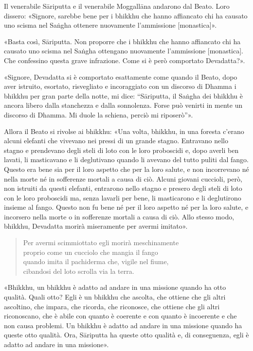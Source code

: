 Il venerabile Sāriputta e il venerabile Moggallāna andarono dal Beato. Loro
dissero: «Signore, sarebbe bene per i bhikkhu che hanno affiancato chi ha
causato uno scisma nel Saṅgha ottenere nuovamente l’ammissione [monastica]».

«Basta così, Sāriputta. Non proporre che i bhikkhu che hanno affiancato chi ha
causato uno scisma nel Saṅgha ottengano nuovamente l’ammissione [monastica]. Che
confessino questa grave infrazione. Come si è però comportato Devadatta?».

«Signore, Devadatta si è comportato esattamente come quando il Beato, dopo aver
istruito, esortato, risvegliato e incoraggiato con un discorso di Dhamma i
bhikkhu per gran parte della notte, mi dice: “Sāriputta, il Saṅgha dei bhikkhu è
ancora libero dalla stanchezza e dalla sonnolenza. Forse può venirti in mente un
discorso di Dhamma. Mi duole la schiena, perciò mi riposerò”».

Allora il Beato si rivolse ai bhikkhu: «Una volta, bhikkhu, in una foresta
c’erano alcuni elefanti che vivevano nei pressi di un grande stagno. Entravano
nello stagno e prendevano degli steli di loto con le loro proboscidi e, dopo
averli ben lavati, li masticavano e li deglutivano quando li avevano del tutto
puliti dal fango. Questo era bene sia per il loro aspetto che per la loro
salute, e non incorrevano né nella morte né in sofferenze mortali a causa di
ciò. Alcuni giovani cuccioli, però, non istruiti da questi elefanti, entrarono
nello stagno e presero degli steli di loto con le loro proboscidi ma, senza
lavarli per bene, li masticarono e li deglutirono insieme al fango. Questo non
fu bene né per il loro aspetto né per la loro salute, e incorsero nella morte o
in sofferenze mortali a causa di ciò. Allo stesso modo, bhikkhu, Devadatta
morirà miseramente per avermi imitato».

\begin{quote}
Per avermi scimmiottato egli morirà meschinamente \\
proprio come un cucciolo che mangia il fango \\
quando imita il pachiderma che, vigile nel fiume, \\
cibandosi del loto scrolla via la terra.
\end{quote}


«Bhikkhu, un bhikkhu è adatto ad andare in una missione quando ha otto qualità.
Quali otto? Egli è un bhikkhu che ascolta, che ottiene che gli altri ascoltino,
che impara, che ricorda, che riconosce, che ottiene che gli altri riconoscano,
che è abile con quanto è coerente e con quanto è incoerente e che non causa
problemi. Un bhikkhu è adatto ad andare in una missione quando ha queste otto
qualità. Ora, Sāriputta ha queste otto qualità e, di conseguenza, egli è adatto
ad andare in una missione».

